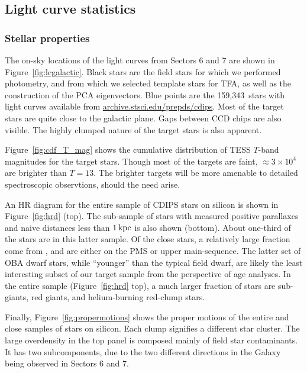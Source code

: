 \documentclass[12pt,twocolumn,tighten]{aastex62}
\newcommand{\numberlcs}{159{,}343\ } %
\newcommand{\stscilink}{\url{archive.stsci.edu/prepds/cdips}}
\begin{document}
\subsection{Light curve statistics}
\label{subsec:lcstatistics}

\subsubsection{Stellar properties}

The on-sky locations of the light curves from Sectors 6 and 7 are
shown in Figure~\ref{fig:lcgalactic}.  Black stars are the field stars
for which we performed photometry, and from which we selected template
stars for TFA, as well as the construction of the PCA eigenvectors.
Blue points are the \numberlcs stars with light curves available from
\stscilink.  Most of the target stars are quite close to the galactic
plane.  Gaps between CCD chips are also visible.  The highly clumped
nature of the target stars is also apparent.

Figure~\ref{fig:cdf_T_mag} shows the cumulative distribution of TESS
$T$-band magnitudes for the target stars.  Though most of the targets
are faint, $\approx3\times10^4$ are brighter than $T=13$. The brighter
targets will be more amenable to detailed spectroscopic observtions,
should the need arise.

An HR diagram for the entire sample of CDIPS stars on silicon is shown
in Figure~\ref{fig:hrd} (top).  The sub-sample of stars with measured
positive parallaxes and naive distances less than $1\,{\rm kpc}$ is
also shown (bottom).  About one-third of the stars are in this latter
sample.  Of the close stars, a relatively large fraction come from
\citet{zari_3d_2018}, and are either on the PMS or upper
main-sequence.  The latter set of OBA dwarf stars, while ``younger''
than the typical field dwarf, are likely the least interesting subset
of our target sample from the perspective of age analyses.  In the
entire sample (Figure~\ref{fig:hrd} top), a much larger fraction of
stars are sub-giants, red giants, and helium-burning red-clump stars.

Finally, Figure~\ref{fig:propermotions} shows the proper motions of
the entire and close samples of stars on silicon.  Each clump
signifies a different star cluster. The large overdensity in the top
panel is composed mainly of field star contaminants. It has two
subcomponents, due to the two different directions in the Galaxy being
observed in Sectors 6 and 7.
\end{document}
